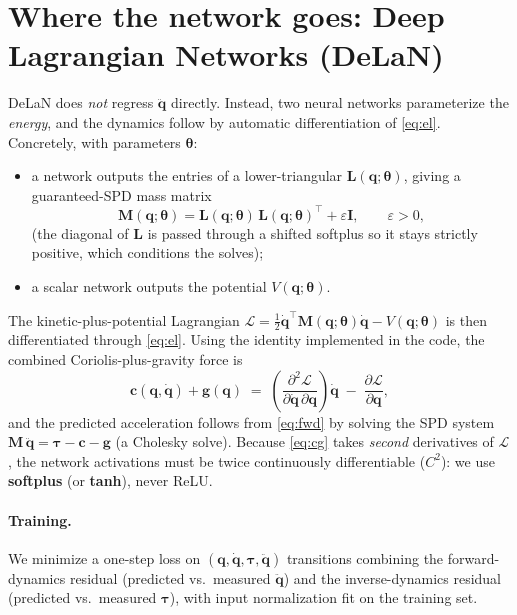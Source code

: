\documentclass[11pt]{article}
\newcommand{\q}{\bm{q}}
\newcommand{\qd}{\dot{\bm{q}}}
\newcommand{\qdd}{\ddot{\bm{q}}}
\newcommand{\M}{\bm{M}}
\newcommand{\Lo}{\bm{L}}
\begin{document}
\section{Where the network goes: Deep Lagrangian Networks (DeLaN)}
\label{sec:delan}
DeLaN \cite{lutter2019delan} does \emph{not} regress $\qdd$ directly. Instead,
two neural networks parameterize the \emph{energy}, and the dynamics follow by
automatic differentiation of \eqref{eq:el}. Concretely, with parameters
$\bm{\theta}$:
\begin{itemize}
  \item a network outputs the entries of a lower-triangular
  $\Lo(\q;\bm{\theta})$, giving a guaranteed-SPD mass matrix
  \begin{equation}
  \M(\q;\bm{\theta}) = \Lo(\q;\bm{\theta})\,\Lo(\q;\bm{\theta})^{\top}
  + \varepsilon\bm{I}, \qquad \varepsilon>0,
  \label{eq:cholesky}
  \end{equation}
  (the diagonal of $\Lo$ is passed through a shifted softplus so it stays
  strictly positive, which conditions the solves);
  \item a scalar network outputs the potential $V(\q;\bm{\theta})$.
\end{itemize}
The kinetic-plus-potential Lagrangian
$\mathcal{L}=\tfrac12\qd^{\top}\M(\q;\bm\theta)\qd-V(\q;\bm\theta)$ is then
differentiated through \eqref{eq:el}. Using the identity implemented in the code,
the combined Coriolis-plus-gravity force is
\begin{equation}
\bm{c}(\q,\qd)+\bm{g}(\q) \;=\;
\left(\frac{\partial^{2}\mathcal{L}}{\partial\qd\,\partial\q}\right)\!\qd
\;-\;\frac{\partial \mathcal{L}}{\partial \q},
\label{eq:cg}
\end{equation}
and the predicted acceleration follows from \eqref{eq:fwd} by solving the SPD
system $\M\,\qdd = \bm\tau-\bm c-\bm g$ (a Cholesky solve). Because
\eqref{eq:cg} takes \emph{second} derivatives of $\mathcal{L}$, the network
activations must be twice continuously differentiable ($C^{2}$): we use
\textbf{softplus} (or \textbf{tanh}), never ReLU.

\paragraph{Training.}
We minimize a one-step loss on $(\q,\qd,\bm\tau,\qdd)$ transitions combining the
forward-dynamics residual (predicted vs.\ measured $\qdd$) and the
inverse-dynamics residual (predicted vs.\ measured $\bm\tau$), with input
normalization fit on the training set.
\end{document}
